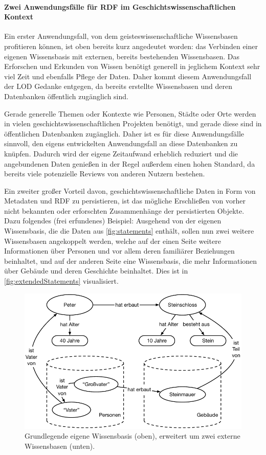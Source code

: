 \paragraph{Zwei Anwendungsfälle für RDF im Geschichtswissenschaftlichen Kontext}

Ein erster Anwendungsfall, von dem geisteswissenschaftliche Wissensbasen profitieren können, ist oben bereits kurz angedeutet worden: das Verbinden einer eigenen Wissensbasis mit externen, bereits bestehenden Wissensbasen. Das Erforschen und Erkunden von Wissen benötigt generell in jeglichem Kontext sehr viel Zeit und ebenfalls Pflege der Daten. Daher kommt diesem Anwendungsfall der LOD Gedanke entgegen, da bereits erstellte Wissensbasen und deren Datenbanken öffentlich zugänglich sind.

Gerade generelle Themen oder Kontexte wie Personen, Städte oder Orte werden in vielen geschichtswissenschaftlichen Projekten benötigt, und gerade diese sind in öffentlichen Datenbanken zugänglich. Daher ist es für diese Anwendungsfälle sinnvoll, den eigens entwickelten Anwendungsfall an diese Datenbanken zu knüpfen. Dadurch wird der eigene Zeitaufwand erheblich reduziert und die angebundenen Daten genießen in der Regel außerdem einen hohen Standard, da bereits viele potenzielle Reviews von anderen Nutzern bestehen.

Ein zweiter großer Vorteil davon, geschichtswissenschaftliche Daten in Form von Metadaten und RDF zu persistieren, ist das mögliche Erschließen von vorher nicht bekannten oder erforschten Zusammenhänge der persistierten Objekte. Dazu folgendes (frei erfundenes) Beispiel: Ausgehend von der eigenen Wissensbasis, die die Daten aus \autoref{fig:statements} enthält, sollen nun zwei weitere Wissensbasen angekoppelt werden, welche auf der einen Seite weitere Informationen über Personen und vor allem deren familiärer Beziehungen beinhaltet, und auf der anderen Seite eine Wissensbasis, die mehr Informationen über Gebäude und deren Geschichte beinhaltet. Dies ist in \autoref{fig:extendedStatements} visualisiert.

\begin{figure}[htb]
    \centering
    \includegraphics[width=\textwidth]{Figures/berndl/extendedStatements}
    \caption{\label{fig:extendedStatements} Grundlegende eigene Wissensbasis (oben), erweitert um zwei externe Wissensbasen (unten).}
\end{figure}

